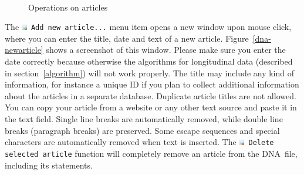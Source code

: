 \documentclass[12pt,a4paper]{scrreprt}
\newcommand{\dnashort}{\textsc{DNA}}
\newcommand{\code}[1]{\texttt{#1}}
\begin{document}
\begin{figure}
	\centering
	\\
	\hspace{1cm}
	\caption{Operations on articles}
	\label{article-screenshots}
\end{figure}

The \code{\includegraphics[height=9px]{icons-newarticle.png} Add new article...} menu item opens a new window upon mouse click, where you can enter the title, date and text of a new article. Figure~\ref{dna-newarticle} shows a screenshot of this window. Please make sure you enter the date correctly because otherwise the algorithms for longitudinal data (described in section~\ref{algorithm}) will not work properly. The title may include any kind of information, for instance a unique ID if you plan to collect additional information about the articles in a separate database. Duplicate article titles are not allowed. You can copy your article from a website or any other text source and paste it in the text field. Single line breaks are automatically removed, while double line breaks (paragraph breaks) are preserved. Some escape sequences and special characters are automatically removed when text is inserted. The \code{\includegraphics[height=9px]{icons-deletearticle.png} Delete selected article} function will completely remove an article from the \dnashort\ file, including its statements.
\end{document}
